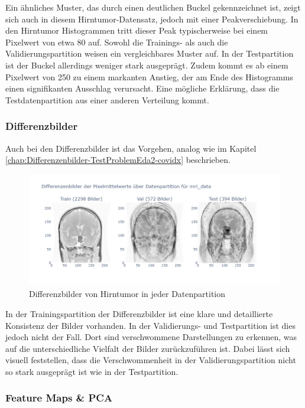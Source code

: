 Ein ähnliches Muster, das durch einen deutlichen Buckel gekennzeichnet ist, zeigt sich auch in diesem Hirntumor-Datensatz, jedoch mit einer Peakverschiebung. In den Hirntumor Histogrammen tritt dieser Peak typischerweise bei einem Pixelwert von etwa 80 auf. Sowohl die Trainings- als auch die Validierungspartition weisen ein vergleichbares Muster auf. In der Testpartition ist der Buckel allerdings weniger stark ausgeprägt. Zudem kommt es ab einem Pixelwert von 250 zu einem markanten Anstieg, der am Ende des Histogramms einen signifikanten Ausschlag verursacht. Eine mögliche Erklärung, dass die Testdatenpartition aus einer anderen Verteilung kommt. 

\subsubsection{Differenzbilder} \label{chap:Differenzenbilder-TestProblemEda2-mri}

Auch bei den Differenzbilder ist das Vorgehen, analog wie im Kapitel \ref{chap:Differenzenbilder-TestProblemEda2-covidx} beschrieben. 

\begin{figure}[ht]
    \centering
    \includegraphics[width=\linewidth, height=5cm]{01-images/03-data/brain-Differenzenbilder-Partition.png}
    \caption{Differenzbilder von Hirntumor in jeder Datenpartition}
    \label{fig:differenzenbilder-datapartition-brain}
\end{figure}

In der Trainingspartition der Differenzbilder ist eine klare und detaillierte Konsistenz der Bilder vorhanden. In der Validierungs- und Testpartition ist dies jedoch nicht der Fall. Dort sind verschwommene Darstellungen zu erkennen, was auf die unterschiedliche Vielfalt der Bilder zurückzuführen ist. Dabei lässt sich visuell feststellen, dass die Verschwommenheit in der Validierungspartition nicht so stark ausgeprägt ist wie in der Testpartition.

\subsubsection{Feature Maps \& PCA} \label{chap:FeatureMaps-TestProblemEda3-mri}


\newpage